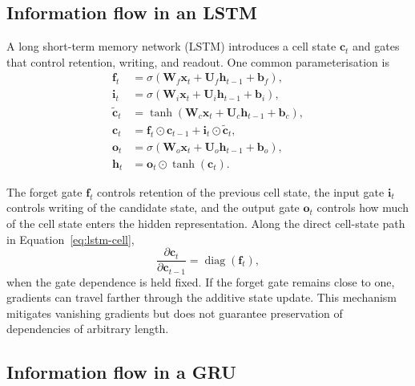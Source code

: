 \subsection{Information flow in an LSTM}

A long short-term memory network (LSTM) introduces a cell state \(\mathbf{c}_t\) and gates that control retention, writing, and readout. One common parameterisation is
\begin{align}
    \mathbf{f}_t
    &=\sigma\!\left(
      \mathbf{W}_f\mathbf{x}_t
      +\mathbf{U}_f\mathbf{h}_{t-1}
      +\mathbf{b}_f
    \right),\\
    \mathbf{i}_t
    &=\sigma\!\left(
      \mathbf{W}_i\mathbf{x}_t
      +\mathbf{U}_i\mathbf{h}_{t-1}
      +\mathbf{b}_i
    \right),\\
    \widetilde{\mathbf{c}}_t
    &=\tanh\!\left(
      \mathbf{W}_c\mathbf{x}_t
      +\mathbf{U}_c\mathbf{h}_{t-1}
      +\mathbf{b}_c
    \right),\\
    \mathbf{c}_t
    &=\mathbf{f}_t\odot\mathbf{c}_{t-1}
      +\mathbf{i}_t\odot\widetilde{\mathbf{c}}_t,
    \label{eq:lstm-cell}\\
    \mathbf{o}_t
    &=\sigma\!\left(
      \mathbf{W}_o\mathbf{x}_t
      +\mathbf{U}_o\mathbf{h}_{t-1}
      +\mathbf{b}_o
    \right),\\
    \mathbf{h}_t
    &=\mathbf{o}_t\odot\tanh(\mathbf{c}_t).
    \label{eq:lstm-hidden}
\end{align}

\LstmFlowFigure

The forget gate \(\mathbf{f}_t\) controls retention of the previous cell state, the input gate \(\mathbf{i}_t\) controls writing of the candidate state, and the output gate \(\mathbf{o}_t\) controls how much of the cell state enters the hidden representation. Along the direct cell-state path in Equation~\eqref{eq:lstm-cell},
\[
    \frac{\partial\mathbf{c}_t}
         {\partial\mathbf{c}_{t-1}}
    =\operatorname{diag}(\mathbf{f}_t),
\]
when the gate dependence is held fixed. If the forget gate remains close to one, gradients can travel farther through the additive state update. This mechanism mitigates vanishing gradients but does not guarantee preservation of dependencies of arbitrary length.

\subsection{Information flow in a GRU}

